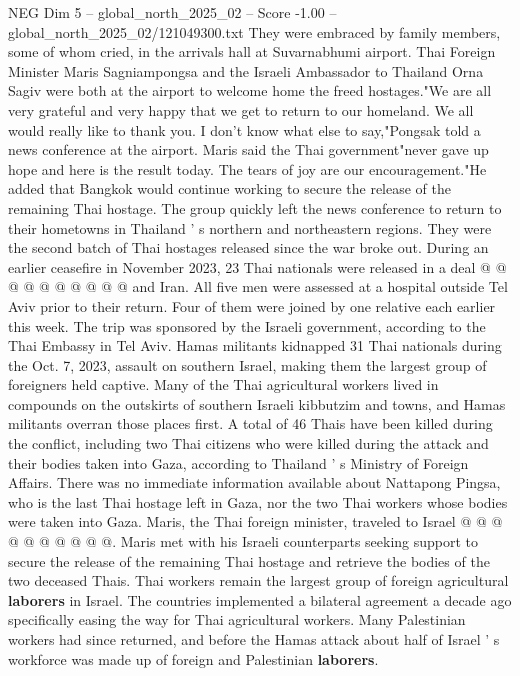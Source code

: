 \begin{textsample}{NEG Dim 5 – global\_north\_2025\_02 – Score -1.00 – global\_north\_2025\_02/121049300.txt}  \label{ex:f5_neg_246}
They were embraced by family members, some of whom cried, in the arrivals hall at Suvarnabhumi airport.
Thai Foreign Minister Maris Sagniampongsa and the Israeli Ambassador to Thailand Orna Sagiv were both at the airport to welcome home the freed hostages."We are all very grateful and very happy that we get to return to our homeland.
We all would really like to thank you.
I don't know what else to say,"Pongsak told a news conference at the airport.
Maris said the Thai government"never gave up hope and here is the result today.
The tears of joy are our encouragement."He added that Bangkok would continue working to secure the release of the remaining Thai hostage.
The group quickly left the news conference to return to their hometowns in Thailand ' s northern and northeastern regions.
They were the second batch of Thai hostages released since the war broke out.
During an earlier ceasefire in November 2023, 23 Thai nationals were released in a deal @ @ @ @ @ @ @ @ @ @ and Iran.
All five men were assessed at a hospital outside Tel Aviv prior to their return.
Four of them were joined by one relative each earlier this week.
The trip was sponsored by the Israeli government, according to the Thai Embassy in Tel Aviv.
Hamas militants kidnapped 31 Thai nationals during the Oct. 7, 2023, assault on southern Israel, making them the largest group of foreigners held captive.
Many of the Thai agricultural workers lived in compounds on the outskirts of southern Israeli kibbutzim and towns, and Hamas militants overran those places first.
A total of 46 Thais have been killed during the conflict, including two Thai citizens who were killed during the attack and their bodies taken into Gaza, according to Thailand ' s Ministry of Foreign Affairs.
There was no immediate information available about Nattapong Pingsa, who is the last Thai hostage left in Gaza, nor the two Thai workers whose bodies were taken into Gaza.
Maris, the Thai foreign minister, traveled to Israel @ @ @ @ @ @ @ @ @ @.
Maris met with his Israeli counterparts seeking support to secure the release of the remaining Thai hostage and retrieve the bodies of the two deceased Thais.
Thai workers remain the largest group of foreign agricultural \textbf{laborers} in Israel.
The countries implemented a bilateral agreement a decade ago specifically easing the way for Thai agricultural workers.
Many Palestinian workers had since returned, and before the Hamas attack about half of Israel ' s workforce was made up of foreign and Palestinian \textbf{laborers}.

\end{textsample}
